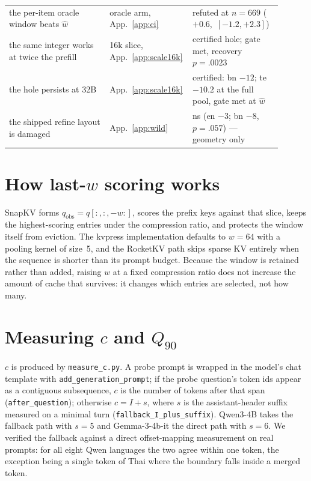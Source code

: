 \documentclass{article}
\begin{document}
\begin{table}[h]
\begin{tabular}{>{\raggedright\arraybackslash}p{0.36\linewidth}%
                >{\raggedright\arraybackslash}p{0.22\linewidth}%
                >{\raggedright\arraybackslash}p{0.32\linewidth}}
the per-item oracle window beats $\hat w$ & oracle arm, App.~\ref{app:ci} & refuted at $n{=}669$ ($+0.6$,~$[-1.2,+2.3]$) \\
the same integer works at twice the prefill & 16k slice, App.~\ref{app:scale16k} & certified hole; gate met, recovery \mbox{$p{=}.0023$} \\
the hole persists at 32B & App.~\ref{app:scale16k} & certified: bn $-12$; te $-10.2$ at the full pool, gate met at $\hat w$ \\
the shipped refine layout is damaged & App.~\ref{app:wild} & ns (en $-3$; bn $-8$, \mbox{$p{=}.057$}) --- geometry only \\
\bottomrule
\end{tabular}
\end{table}

\section{How last-$w$ scoring works}
\label{app:snapkv}
SnapKV forms $q_{\mathrm{obs}} = q[:,:,-w:]$, scores the prefix keys
against that slice, keeps the highest-scoring entries under the
compression ratio, and protects the window itself from eviction. The
kvpress implementation defaults to $w{=}64$ with a pooling kernel of
size~5, and the RocketKV path skips sparse KV entirely when the sequence
is shorter than its prompt budget.
Because the window is retained rather than added, raising $w$ at a fixed
compression ratio does not increase the amount of cache that survives:
it changes which entries are selected, not how many.

\section{Measuring $c$ and $Q_{90}$}
\label{app:measure}
$c$ is produced by \texttt{measure\_c.py}. A probe prompt is wrapped in
the model's chat template with \texttt{add\_generation\_prompt}; if the
probe question's token ids appear as a contiguous subsequence, $c$ is the
number of tokens after that span (\texttt{after\_question}); otherwise
$c = I + s$, where $s$ is the assistant-header suffix measured on a
minimal turn (\texttt{fallback\_I\_plus\_suffix}). Qwen3-4B takes the
fallback path with $s{=}5$ and Gemma-3-4b-it the direct path with
$s{=}6$. We verified the fallback against a direct offset-mapping
measurement on real prompts: for all eight Qwen languages the two agree
within one token, the exception being a single token of Thai where the
boundary falls inside a merged token.
\end{document}
